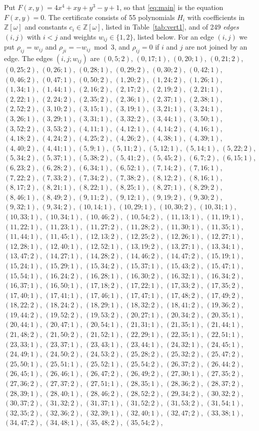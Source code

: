 \documentclass[11pt]{article}
\newcommand{\Z}{\mathbb{Z}}
\begin{document}
Put $F(x,y)=4x^{4}+xy+y^{3}-y+1$, so that \eqref{eq:main} is the equation $F(x,y)=0$. The certificate consists of 55 polynomials $H_i$ with coefficients in $\Z[\omega]$ and constants $c_i\in\Z[\omega]$, listed in Table~\ref{tab:vert1}, and of 249 \emph{edges} $(i,j)$ with $i<j$ and weights $w_{ij}\in\{1,2\}$, listed below. For an edge $(i,j)$ we put $\rho_{ij}=w_{ij}$ and $\rho_{ji}=-w_{ij}\bmod 3$, and $\rho_{ij}=0$ if $i$ and $j$ are not joined by an edge.
The edges $(i,j;w_{ij})$ are $(0,5;2)$, $(0,17;1)$, $(0,20;1)$, $(0,21;2)$, $(0,25;2)$, $(0,26;1)$, $(0,28;1)$, $(0,29;2)$, $(0,30;2)$, $(0,42;1)$, $(0,46;2)$, $(0,47;1)$, $(0,50;2)$, $(1,20;2)$, $(1,24;2)$, $(1,26;1)$, $(1,34;1)$, $(1,44;1)$, $(2,16;2)$, $(2,17;2)$, $(2,19;2)$, $(2,21;1)$, $(2,22;1)$, $(2,24;2)$, $(2,35;2)$, $(2,36;1)$, $(2,37;1)$, $(2,38;1)$, $(2,52;2)$, $(3,10;2)$, $(3,15;1)$, $(3,19;1)$, $(3,21;1)$, $(3,24;1)$, $(3,26;1)$, $(3,29;1)$, $(3,31;1)$, $(3,32;2)$, $(3,44;1)$, $(3,50;1)$, $(3,52;2)$, $(3,53;2)$, $(4,11;1)$, $(4,12;1)$, $(4,14;2)$, $(4,16;1)$, $(4,18;2)$, $(4,24;2)$, $(4,25;2)$, $(4,26;2)$, $(4,38;1)$, $(4,39;1)$, $(4,40;2)$, $(4,41;1)$, $(5,9;1)$, $(5,11;2)$, $(5,12;1)$, $(5,14;1)$, $(5,22;2)$, $(5,34;2)$, $(5,37;1)$, $(5,38;2)$, $(5,41;2)$, $(5,45;2)$, $(6,7;2)$, $(6,15;1)$, $(6,23;2)$, $(6,28;2)$, $(6,34;1)$, $(6,52;1)$, $(7,14;2)$, $(7,16;1)$, $(7,22;2)$, $(7,33;2)$, $(7,34;2)$, $(7,38;2)$, $(8,12;2)$, $(8,16;1)$, $(8,17;2)$, $(8,21;1)$, $(8,22;1)$, $(8,25;1)$, $(8,27;1)$, $(8,29;2)$, $(8,46;1)$, $(8,49;2)$, $(9,11;2)$, $(9,12;1)$, $(9,19;2)$, $(9,30;2)$, $(9,32;1)$, $(9,34;2)$, $(10,14;1)$, $(10,29;1)$, $(10,30;2)$, $(10,31;1)$, $(10,33;1)$, $(10,34;1)$, $(10,46;2)$, $(10,54;2)$, $(11,13;1)$, $(11,19;1)$, $(11,22;1)$, $(11,23;1)$, $(11,27;2)$, $(11,28;2)$, $(11,30;1)$, $(11,35;1)$, $(11,44;1)$, $(11,45;1)$, $(12,13;2)$, $(12,25;2)$, $(12,26;1)$, $(12,27;1)$, $(12,28;1)$, $(12,40;1)$, $(12,52;1)$, $(13,19;2)$, $(13,27;1)$, $(13,34;1)$, $(13,47;2)$, $(14,27;1)$, $(14,28;2)$, $(14,46;2)$, $(14,47;2)$, $(15,19;1)$, $(15,24;1)$, $(15,29;1)$, $(15,34;2)$, $(15,37;1)$, $(15,43;2)$, $(15,47;1)$, $(15,54;1)$, $(16,24;2)$, $(16,28;1)$, $(16,30;2)$, $(16,32;1)$, $(16,34;2)$, $(16,37;1)$, $(16,50;1)$, $(17,18;2)$, $(17,22;1)$, $(17,33;2)$, $(17,35;2)$, $(17,40;1)$, $(17,41;1)$, $(17,46;1)$, $(17,47;1)$, $(17,48;2)$, $(17,49;2)$, $(18,22;2)$, $(18,24;2)$, $(18,29;1)$, $(18,32;2)$, $(18,41;2)$, $(19,36;2)$, $(19,44;2)$, $(19,52;2)$, $(19,53;2)$, $(20,27;1)$, $(20,34;2)$, $(20,35;1)$, $(20,44;1)$, $(20,47;1)$, $(20,54;1)$, $(21,31;1)$, $(21,35;1)$, $(21,44;1)$, $(21,48;2)$, $(21,50;2)$, $(21,52;1)$, $(22,29;1)$, $(22,35;1)$, $(22,51;1)$, $(23,33;1)$, $(23,37;1)$, $(23,43;1)$, $(23,44;1)$, $(24,32;1)$, $(24,45;1)$, $(24,49;1)$, $(24,50;2)$, $(24,53;2)$, $(25,28;2)$, $(25,32;2)$, $(25,47;2)$, $(25,50;1)$, $(25,51;1)$, $(25,52;1)$, $(25,54;2)$, $(26,37;2)$, $(26,44;2)$, $(26,45;1)$, $(26,46;1)$, $(26,47;2)$, $(26,49;2)$, $(27,30;1)$, $(27,35;2)$, $(27,36;2)$, $(27,37;2)$, $(27,51;1)$, $(28,35;1)$, $(28,36;2)$, $(28,37;2)$, $(28,39;1)$, $(28,40;1)$, $(28,46;2)$, $(28,52;2)$, $(29,34;2)$, $(30,32;2)$, $(30,37;2)$, $(31,32;2)$, $(31,37;1)$, $(31,52;2)$, $(31,53;2)$, $(31,54;1)$, $(32,35;2)$, $(32,36;2)$, $(32,39;1)$, $(32,40;1)$, $(32,47;2)$, $(33,38;1)$, $(34,47;2)$, $(34,48;1)$, $(35,48;2)$, $(35,54;2)$, 
\end{document}
